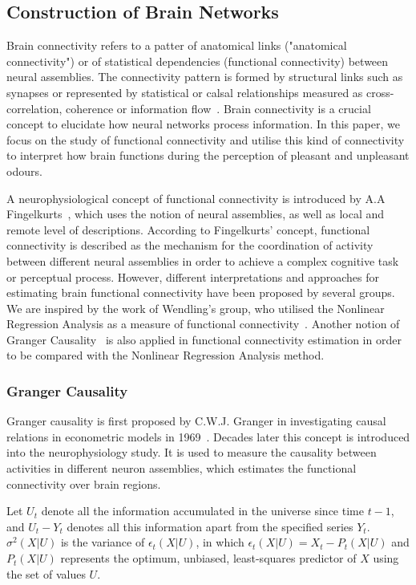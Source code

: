 \subsection{Construction of Brain Networks}
Brain connectivity refers to a patter of anatomical links ("anatomical connectivity") or of statistical dependencies (functional connectivity) between neural assemblies. The connectivity pattern is formed by structural links such as synapses or represented by statistical or calsal relationships measured as cross-correlation, coherence or information flow~\cite{sporns2007brain}. Brain connectivity is a crucial concept to elucidate how neural networks process information. In this paper, we focus on the study of functional connectivity and utilise this kind of connectivity to interpret how brain functions during the perception of pleasant and unpleasant odours. 

A neurophysiological concept of functional connectivity is introduced by A.A Fingelkurts~\cite{fingelkurts2005functional}, which uses the notion of neural assemblies, as well as local and remote level of descriptions. According to Fingelkurts' concept, functional connectivity is described as the mechanism for the coordination of activity between different neural assemblies in order to achieve a complex cognitive task or perceptual process. However, different interpretations and approaches for estimating brain functional connectivity have been proposed by several groups. We are inspired by the work of Wendling's group, who utilised the Nonlinear Regression Analysis as a measure of functional connectivity~\cite{bettus2008enhanced}. Another notion of Granger Causality~\cite{roebroeck2005mapping} is also applied in functional connectivity estimation in order to be compared with the Nonlinear Regression Analysis method. 
\subsubsection{Granger Causality}
Granger causality is first proposed by C.W.J. Granger in investigating causal relations in econometric models in 1969~\cite{granger1969investigating}. Decades later this concept is introduced into the neurophysiology study. It is used to measure the causality between activities in different neuron assemblies, which estimates the functional connectivity over brain regions. 

Let $U_t$ denote all the information accumulated in the universe since time $t-1$, and $U_t-Y_t$ denotes all this information apart from the specified series $Y_t$. $\sigma^2(X|U)$ is the variance of $\epsilon_t(X|U)$, in which $\epsilon_t(X|U)=X_t-P_t(X|U)$ and $P_t(X|U)$ represents the optimum, unbiased, least-squares predictor of $X$ using the set of values $U$.

